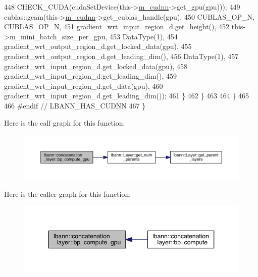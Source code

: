 \begin{DoxyCode}
448           CHECK\_CUDA(cudaSetDevice(this->\hyperlink{classlbann_1_1Layer_a08dbb94239e3b8c96329786c57c72e21}{m\_cudnn}->get\_gpu(gpu)));
449           cublas::geam(this->\hyperlink{classlbann_1_1Layer_a08dbb94239e3b8c96329786c57c72e21}{m\_cudnn}->get\_cublas\_handle(gpu),
450                        CUBLAS\_OP\_N, CUBLAS\_OP\_N,
451                        gradient\_wrt\_input\_region\_d.get\_height(),
452                        this->m\_mini\_batch\_size\_per\_gpu,
453                        DataType(1),
454                        gradient\_wrt\_output\_region\_d.get\_locked\_data(gpu),
455                        gradient\_wrt\_output\_region\_d.get\_leading\_dim(),
456                        DataType(1),
457                        gradient\_wrt\_input\_region\_d.get\_locked\_data(gpu),
458                        gradient\_wrt\_input\_region\_d.get\_leading\_dim(),
459                        gradient\_wrt\_input\_region\_d.get\_data(gpu),
460                        gradient\_wrt\_input\_region\_d.get\_leading\_dim());
461         \}
462       \}
463 
464     \}
465 
466 \textcolor{preprocessor}{  #endif // LBANN\_HAS\_CUDNN}
467   \}
\end{DoxyCode}
Here is the call graph for this function\+:\nopagebreak
\begin{figure}[H]
\begin{center}
\leavevmode
\includegraphics[width=350pt]{classlbann_1_1concatenation__layer_aa024e4ba8d10aec75c89075e6e0cc28d_cgraph}
\end{center}
\end{figure}
Here is the caller graph for this function\+:\nopagebreak
\begin{figure}[H]
\begin{center}
\leavevmode
\includegraphics[width=350pt]{classlbann_1_1concatenation__layer_aa024e4ba8d10aec75c89075e6e0cc28d_icgraph}
\end{center}
\end{figure}
\mbox{\label{classlbann_1_1concatenation__layer_a8cdb0b6f5dee578477a3125f5da74573}} 
